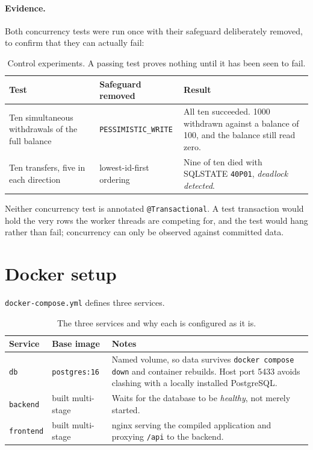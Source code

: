 \documentclass[11pt,a4paper]{article}
\begin{document}
\paragraph{Evidence.} Both concurrency tests were run once with their safeguard deliberately
removed, to confirm that they can actually fail:

\begin{table}[htbp]
\centering\small
\begin{tabular}{@{}L{4.4cm}L{3.4cm}L{6.4cm}@{}}
\toprule
\textbf{Test} & \textbf{Safeguard removed} & \textbf{Result} \\
\midrule
Ten simultaneous withdrawals of the full balance &
\texttt{PESSIMISTIC\_WRITE} &
All ten succeeded. 1000 withdrawn against a balance of 100, and the balance still read zero. \\
\addlinespace
Ten transfers, five in each direction &
lowest-id-first ordering &
Nine of ten died with SQLSTATE \texttt{40P01}, \emph{deadlock detected}. \\
\bottomrule
\end{tabular}
\caption{Control experiments. A passing test proves nothing until it has been seen to fail.}
\end{table}

Neither concurrency test is annotated \texttt{@Transactional}. A test transaction would hold the
very rows the worker threads are competing for, and the test would hang rather than fail;
concurrency can only be observed against committed data.

\section{Docker setup}

\texttt{docker-compose.yml} defines three services.

\begin{table}[htbp]
\centering\small
\begin{tabular}{@{}llL{8.4cm}@{}}
\toprule
\textbf{Service} & \textbf{Base image} & \textbf{Notes} \\
\midrule
\texttt{db}       & \texttt{postgres:16}  & Named volume, so data survives \texttt{docker compose down} and container rebuilds. Host port 5433 avoids clashing with a locally installed PostgreSQL. \\
\addlinespace
\texttt{backend}  & built multi-stage     & Waits for the database to be \emph{healthy}, not merely started. \\
\addlinespace
\texttt{frontend} & built multi-stage     & nginx serving the compiled application and proxying \texttt{/api} to the backend. \\
\bottomrule
\end{tabular}
\caption{The three services and why each is configured as it is.}
\end{table}
\end{document}
